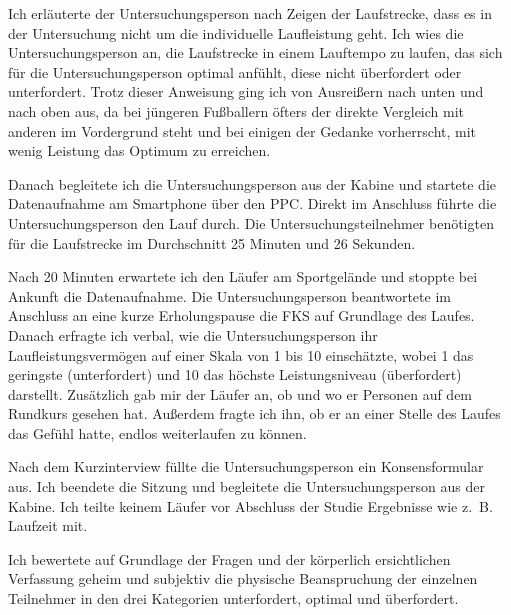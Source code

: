 Ich erläuterte der Untersuchungsperson nach Zeigen der Laufstrecke, dass es in der Untersuchung nicht um die individuelle Laufleistung geht. Ich wies die Untersuchungsperson an, die Laufstrecke in einem Lauftempo zu laufen, das sich für die Untersuchungsperson optimal anfühlt, diese nicht überfordert oder unterfordert. Trotz dieser Anweisung ging ich von Ausreißern nach unten und nach oben aus, da bei jüngeren Fußballern öfters der direkte Vergleich mit anderen im Vordergrund steht und bei einigen der Gedanke vorherrscht, mit wenig Leistung das Optimum zu erreichen. 

Danach begleitete ich die Untersuchungsperson aus der Kabine und startete die Datenaufnahme am Smartphone über den \ac{PPC}. Direkt im Anschluss führte die Untersuchungsperson den Lauf durch. Die Untersuchungsteilnehmer benötigten für die Laufstrecke im Durchschnitt 25 Minuten und 26 Sekunden. 

Nach 20 Minuten erwartete ich den Läufer am Sportgelände und stoppte bei Ankunft die Datenaufnahme. Die Untersuchungsperson beantwortete im Anschluss an eine kurze Erholungspause die \ac{FKS} auf Grundlage des Laufes. Danach erfragte ich verbal, wie die Untersuchungsperson ihr Laufleistungsvermögen auf einer Skala von 1 bis 10 einschätzte, wobei 1 das geringste (unterfordert) und 10 das höchste Leistungsniveau (überfordert) darstellt. Zusätzlich gab mir der Läufer an, ob und wo er Personen auf dem Rundkurs gesehen hat. Außerdem fragte ich ihn, ob er an einer Stelle des Laufes das Gefühl hatte, endlos weiterlaufen zu können. 

Nach dem Kurzinterview füllte die Untersuchungsperson ein Konsensformular aus. Ich beendete die Sitzung und begleitete die Untersuchungsperson aus der Kabine. Ich teilte keinem Läufer vor Abschluss der Studie Ergebnisse wie z.~B. Laufzeit mit. 

Ich bewertete auf Grundlage der Fragen und der körperlich ersichtlichen Verfassung geheim und subjektiv die physische Beanspruchung der einzelnen Teilnehmer in den drei Kategorien unterfordert, optimal und überfordert.

